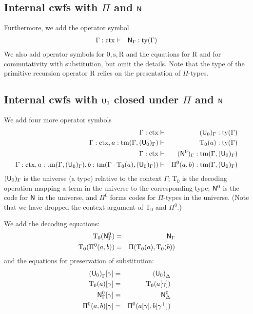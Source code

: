 \documentclass{lmcs}
\newcommand{\FYI}[1]{{\color{red}#1}}
\newcommand{\s}{\mathrm{s}}
\newcommand{\Rec}{\mathrm{R}}
\newcommand{\Ta}{\mathrm{T}}
\newcommand{\ctx}{\mathrm{ctx}}
\newcommand{\ty}{\mathrm{ty}}
\newcommand{\tm}{\mathrm{tm}}
\begin{document}
\subsection{Internal cwfs with $\Pi$ and $\mathsf{N}$}
Furthermore, we add the operator symbol
\begin{eqnarray*}
\Gamma : \ctx &\vdash& \N_\Gamma : \ty(\Gamma)
\end{eqnarray*}
We also add operator symbols for $0, \s, \Rec$ and the equations for $\Rec$ and for commutativity with substitution, but omit the details. Note that the type of the primitive recursion operator $\Rec$ relies on the \FYI{presentation of} $\Pi$-types.

\subsection{Internal cwfs with $\mathsf{U}_0$ closed under $\Pi$ and $\mathsf{N}$}\label{sec:u-example}
We add four more operator symbols
\begin{eqnarray*}
\Gamma : \ctx &\vdash& (\U_0)_\Gamma : \ty(\Gamma)\\
\Gamma : \ctx, a : \tm(\Gamma,(\U_0)_\Gamma) &\vdash& {\Ta_0}(a) : \ty(\Gamma)\\
\Gamma : \ctx &\vdash& (\N^0)_\Gamma : \tm(\Gamma,(\U_0)_\Gamma) \\
\Gamma : \ctx,
a : \tm(\Gamma,(\U_0)_\Gamma),
b :  \tm(\Gamma \cdot \Ta_0(a), (\U_0)_\Gamma))
&\vdash&
 \Pi^0(a,b) : \tm(\Gamma,(\U_0)_\Gamma)
\end{eqnarray*}
$(\mathsf{U}_0)_\Gamma$ is the universe (a type) relative to the context $\Gamma$; $\Ta_0$ is the decoding operation mapping a term in the universe to the corresponding type; $\mathsf{N}^0$ is the code for $\mathsf{N}$ in the universe, and $\Pi^0$ forms codes for $\Pi$-types in the
 universe. (Note that we have dropped the context argument of $\Ta_0$ and $\Pi^0$.)

We add the decoding equations:
\begin{eqnarray*}
\Ta_0(\N^0_\Gamma) &=& \N_\Gamma\\
\Ta_0(\Pi^0(a,b)) &=& \Pi(\Ta_0(a),\Ta_0(b))
\end{eqnarray*}
and the equations for preservation of substitution:
\begin{eqnarray*}
{(\U_0)}_\Gamma [ \gamma ] &=& {(\U_0)}_\Delta\\
\Ta_0(a) [ \gamma ] &=& \Ta_0(a[ \gamma ] )\\
\N^0_\Gamma [ \gamma ] &=&\N^0_\Delta\\
\Pi^0(a,b)[ \gamma ] &=& \Pi^0(a [ \gamma ], b[ \gamma^+ ])
\end{eqnarray*}
\end{document}
